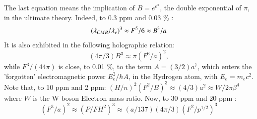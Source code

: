 \documentclass[twoside,draft]{article}
\begin{document}
\begin{sloppypar}
The last equation means the implication of $B = e^{e^{\pi}}$, the double exponential of $\pi$, in the ultimate theory. Indeed, to 0.3 ppm and 0.03 \% :
\begin{equation}
(\lambdabar_{CMB}/\lambdabar_e)^3 \approx F^5/6 \approx B^3/a
\end{equation}
It is also exhibited in the following holographic relation:
\begin{equation}
(4\pi/3) B^3 \approx \pi(F^3/a)^2,
\end{equation}
while $F^3/(44\pi)$ is close, to 0.01 \%, to the term $A = (3/2) a^7$, which enters the 'forgotten' electromagnetic power $E_e^2/\hbar A$, in the Hydrogen atom, with $E_e = m_ec^2$.
Note that, to 10 ppm and 2 ppm:
$
(H/n)^2(F^2/B)^3 \approx (4/3) a^2 \approx W/2\pi \beta^4
$
where $W$ is the W boson-Electron mass ratio. Now, to 30 ppm and 20 ppm :  
\begin{equation}
 (F^3/a)^2 \approx (P/FH^2)^3  \approx  (a/137)(4\pi/3)(F^2/p^{1/2})^3 
\end{equation}



\end{sloppypar}
\end{document}
